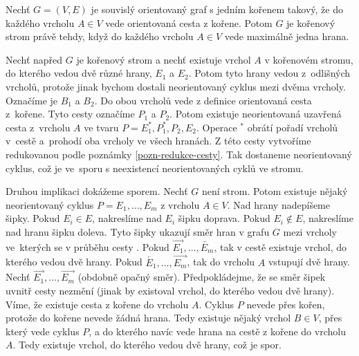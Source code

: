 \begin{lemma}\label{lemma-char-korenoveho-stromu}
    Nechť $G=(V,E)$ je souvislý orientovaný graf s jedním kořenem takový, že do každého vrcholu $A \in V$ vede orientovaná cesta z kořene. Potom $G$ je kořenový strom právě tehdy, když do každého vrcholu $A \in V$ vede maximálně jedna hrana. 
\end{lemma}
\begin{dukaz}
    Nechť napřed $G$ je kořenový strom a nechť existuje vrchol $A$ v kořenovém stromu, do kterého vedou dvě různé hrany, $E_1$ a $E_2$. Potom tyto hrany vedou z~odlišných vrcholů, protože jinak bychom dostali neorientovaný cyklus mezi dvěma vrcholy. Označíme je $B_1$ a $B_2$. Do obou vrcholů vede z definice orientovaná cesta z~kořene. Tyto cesty označíme $P_1$ a $P_2$. Potom existuje neorientovaná uzavřená cesta z~vrcholu $A$ ve tvaru $P = E_1^*, P_1^*, P_2, E_2$. Operace $^*$ obrátí pořadí vrcholů v~cestě a~prohodí oba vrcholy ve všech hranách. Z této cesty vytvoříme redukovanou podle poznámky \ref{pozn-redukce-cesty}. 
    Tak dostaneme neorientovaný cyklus, což je ve~sporu s neexistencí neorientovaných cyklů ve stromu.

    Druhou implikaci dokážeme sporem. Nechť $G$ není strom. Potom existuje nějaký neorientovaný cyklus $P = E_1, \dots , E_m$ z vrcholu $A \in V$. Nad hrany nadepíšeme šipky. Pokud $E_i \in E$, nakreslíme nad $E_i$ šipku doprava. Pokud $E_i \notin E$, nakreslíme nad hranu šipku doleva. Tyto šipky ukazují směr hran v grafu $G$ mezi vrcholy ve~kterých se v průběhu cesty . Pokud $\overrightarrow{E_1}, \dots , \overleftarrow{E_m}$, tak v cestě existuje vrchol, do kterého vedou dvě hrany. Pokud $\overleftarrow{E_1}, \dots , \overrightarrow{E_m}$, tak do vrcholu $A$ vstupují dvě hrany. Nechť $\overrightarrow{E_1}, \dots , \overrightarrow{E_m}$ (obdobně opačný směr). Předpokládejme, že se směr šipek uvnitř cesty nezmění (jinak by existoval vrchol, do kterého vedou dvě hrany). Víme, že existuje cesta z kořene do vrcholu $A$. Cyklus $P$ nevede přes kořen, protože do kořene nevede žádná hrana. Tedy existuje nějaký vrchol $B \in V$, přes který vede cyklus $P$, a do kterého navíc vede hrana na cestě z kořene do vrcholu $A$. Tedy existuje vrchol, do kterého vedou dvě hrany, což je spor. 
\end{dukaz}

